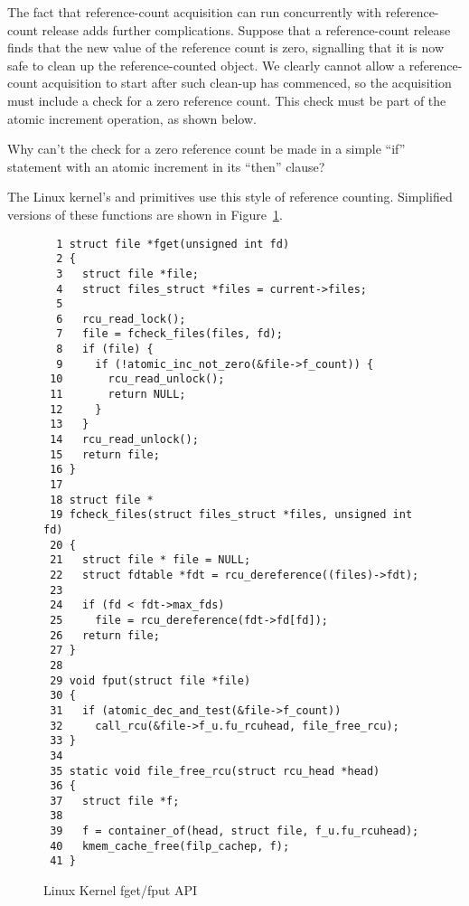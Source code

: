 The fact that reference-count acquisition can run concurrently
with reference-count release adds further complications.
Suppose that a reference-count release finds that the new
value of the reference count is zero, signalling that it is
now safe to clean up the reference-counted object.
We clearly cannot allow a reference-count acquisition to
start after such clean-up has commenced, so the acquisition
must include a check for a zero reference count.
This check must be part of the atomic increment operation,
as shown below.

\QuickQuiz{}
	Why can't the check for a zero reference count be
	made in a simple ``if'' statement with an atomic
	increment in its ``then'' clause?
 \QuickQuizEnd

The Linux kernel's  and  primitives
use this style of reference counting.
Simplified versions of these functions are shown in
Figure~\ref{fig:defer:Linux Kernel fget/fput API}.

\begin{figure}[htbp]
{ \scriptsize
\begin{verbatim}
  1 struct file *fget(unsigned int fd)
  2 {
  3   struct file *file;
  4   struct files_struct *files = current->files;
  5
  6   rcu_read_lock();
  7   file = fcheck_files(files, fd);
  8   if (file) {
  9     if (!atomic_inc_not_zero(&file->f_count)) {
 10       rcu_read_unlock();
 11       return NULL;
 12     }
 13   }
 14   rcu_read_unlock();
 15   return file;
 16 }
 17
 18 struct file *
 19 fcheck_files(struct files_struct *files, unsigned int fd)
 20 {
 21   struct file * file = NULL;
 22   struct fdtable *fdt = rcu_dereference((files)->fdt);
 23
 24   if (fd < fdt->max_fds)
 25     file = rcu_dereference(fdt->fd[fd]);
 26   return file;
 27 }
 28
 29 void fput(struct file *file)
 30 {
 31   if (atomic_dec_and_test(&file->f_count))
 32     call_rcu(&file->f_u.fu_rcuhead, file_free_rcu);
 33 }
 34
 35 static void file_free_rcu(struct rcu_head *head)
 36 {
 37   struct file *f;
 38
 39   f = container_of(head, struct file, f_u.fu_rcuhead);
 40   kmem_cache_free(filp_cachep, f);
 41 }
\end{verbatim}
}
\caption{Linux Kernel fget/fput API}
\label{fig:defer:Linux Kernel fget/fput API}
\end{figure}

